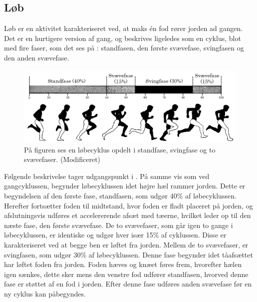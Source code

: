 \subsection{Løb}
Løb er en aktivitet karakteriseret ved, at maks én fod rører jorden ad gangen. 
Det er en hurtigere version af gang, og beskrives ligeledes som en cyklus, blot med fire faser, som det ses på : standfasen, den første svævefase, svingfasen og den anden svævefase. \citep{Adelaar1986,Novacheck1998}

\begin{figure}[H]
	\centering
	\includegraphics[scale=0.4]{figures/bProblemloesning/loeb_cyklus1.png}
	\caption{På figuren ses en løbecyklus opdelt i standfase, svingfase og to svævefaser. \citep{Adelaar1986} (Modificeret)}
	\label{fig:loebecyklus}
\end{figure}

Følgende beskrivelse tager udgangspunkt i . På samme vis som ved gangcyklussen, begynder løbecyklussen idet højre hæl rammer jorden. Dette er begyndelsen af den første fase, standfasen, som udgør 40\% af løbecyklussen. Herefter fortsætter foden til midtstand, hvor foden er fladt placeret på jorden, og afslutningsvis udføres et accelererende afsæt med tæerne, hvilket leder op til den næste fase, den første svævefase. \citep{Adelaar1986,Novacheck1998} \newline
De to svævefaser, som går igen to gange i løbecyklussen, er identiske og udgør hver især 15\% af cyklussen. Disse er karakteriseret ved at begge ben er løftet fra jorden. \citep{Adelaar1986,Novacheck1998} \newline
Mellem de to svævefaser, er svingfasen, som udgør 30\% af løbecyklussen. Denne fase begynder idet tåafsættet har løftet foden fra jorden. Foden hæves og knæet føres frem, hvorefter hælen igen sænkes, dette sker mens den venstre fod udfører standfasen, hvorved denne fase er støttet af en fod i jorden. Efter denne fase udføres anden svævefase før en ny cyklus kan påbegyndes. \citep{Adelaar1986,Novacheck1998}


